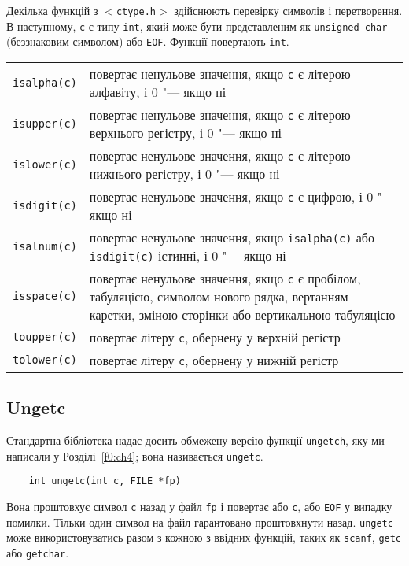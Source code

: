 \documentclass[a4paper,12pt]{book}
\begin{document}
  Декілька функцій з \texttt{\mbox{$<$}ctype.h\mbox{$>$}} здійснюють перевірку символів і
  перетворення. В наступному, \texttt{c} є типу \texttt{int}, який може бути представленим
  як \texttt{unsigned char} (беззнаковим символом) або \texttt{EOF}. Функції повертають
  \texttt{int}.

  \begin{center}
  \begin{tabular}{lp{12cm}}
  \texttt{isalpha(c)} & повертає ненульове значення, якщо \texttt{c} є літерою алфавіту, і
  0 "--- якщо ні \\
  \texttt{isupper(c)} & повертає ненульове значення, якщо \texttt{c} є літерою верхнього 
  регістру, і 0 "--- якщо ні \\
  \texttt{islower(c)} & повертає ненульове значення, якщо \texttt{c} є літерою нижнього
  регістру, і 0 "--- якщо ні \\
  \texttt{isdigit(c)} & повертає ненульове значення, якщо \texttt{c} є цифрою, і 0 "---
  якщо ні \\
  \texttt{isalnum(c)} & повертає ненульове значення, якщо \texttt{isalpha(c)} або
  \texttt{isdigit(c)} істинні, і 0 "--- якщо ні \\
  \texttt{isspace(c)} & повертає ненульове значення, якщо \texttt{c} є пробілом, табуляцією, 
  символом нового рядка, вертанням каретки, зміною сторінки або вертикальною табуляцією \\
  \texttt{toupper(c)} & повертає літеру \texttt{c}, обернену у верхній регістр \\
  \texttt{tolower(c)} & повертає літеру \texttt{c}, обернену у нижній регістр 
  \end{tabular}
  \end{center}

\subsection{Ungetc}


  Стандартна бібліотека надає досить обмежену версію функції \texttt{ungetch}, яку ми
  написали у Розділі~\ref{f0:ch4}; вона називається \texttt{ungetc}.
  \begin{verbatim}
    int ungetc(int c, FILE *fp)
  \end{verbatim}
  
  Вона проштовхує символ \texttt{c} назад у файл \texttt{fp} і повертає або \texttt{c}, або
  \texttt{EOF} у випадку помилки. Тільки один символ на файл гарантовано проштовхнути
  назад. \texttt{ungetc} може використовуватись разом з кожною з ввідних функцій, таких як
  \texttt{scanf}, \texttt{getc} або \texttt{getchar}.
\end{document}
